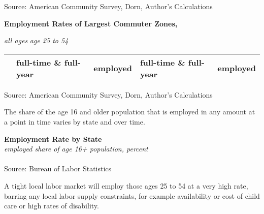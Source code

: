 \documentclass{report}
\newcommand{\tbllink}[1]{\href{https://raw.githubusercontent.com/bdecon/US-chartbook/master/chartbook/data/#1}{\faTable}}
\begin{document}
{\begin{minipage}{0.52\textwidth}
\hspace{-11mm} 

\vspace{-4mm}
\footnotesize{Source: American Community Survey, Dorn, Author's Calculations}
\end{minipage} \hspace{3mm}
\begin{minipage}{0.24\textwidth}
\vspace{-1mm}

\footnotesize 
\end{minipage}
\newpage
\begin{minipage}{0.76\textwidth} 
\normalsize \textbf{Employment Rates of Largest Commuter Zones, }
\vspace{-1mm}

\footnotesize \hspace{42mm} \textit{all ages} \hspace{20mm} \textit{age 25 to 54}\\
 \setlength{\tabcolsep}{3.1pt} \color{black!90}
	{\renewcommand{\arraystretch}{1.55}
		\begin{tabular}{p{24mm} R{15mm} R{15mm} R{15mm} R{15mm}}
		 	& full-time \& full-year & employed & full-time \& full-year & employed \\
			  \hline
		\end{tabular}}	
\vspace{-2mm}

\footnotesize{Source: American Community Survey, Dorn, Author's Calculations}
\vspace{6mm}

\small The share of the age 16 and older population that is employed in any amount at a point in time varies by state and over time. 
\end{minipage}
\vspace{2mm}

\normalsize \textbf{Employment Rate by State}\\
\footnotesize{\textit{employed share of age 16+ population, percent}}\\
\vspace{-2mm}
\hspace{-8mm}  \\
\footnotesize{Source: Bureau of Labor Statistics} \hspace{72mm} \tbllink{state_epop.csv}
\newpage
\begin{minipage}{0.76\textwidth} 
\small A tight local labor market will employ those ages 25 to 54 at a very high rate, barring any local labor supply constraints, for example availability or cost of child care or high rates of disability. 


\end{minipage}}
\end{document}
